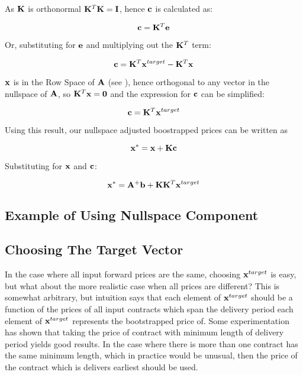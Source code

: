 \documentclass{article}
\begin{document}
As $\mathbf{K}$ is orthonormal $\mathbf{K}^T \mathbf{K} = \mathbf{I}$, hence $\mathbf{c}$ is calculated as:

\begin{equation}
    \mathbf{c} = \mathbf{K}^T \mathbf{e}
\end{equation}

Or, substituting for $\mathbf{e}$ and multiplying out the $\mathbf{K}^T$ term:

\begin{equation}
    \mathbf{c} = \mathbf{K}^T \mathbf{x}^{target} - \mathbf{K}^T \mathbf{x}
\end{equation}

$\mathbf{x}$ is in the Row Space of $\mathbf{A}$ (see \cite{Strang}), hence orthogonal to 
any vector in the nullspace of $\mathbf{A}$, so $\mathbf{K}^T \mathbf{x} = \mathbf{0}$ and the expression 
for $\mathbf{c}$ can be simplified:

\begin{equation}
    \mathbf{c} = \mathbf{K}^T \mathbf{x}^{target}
\end{equation}



Using this result, our nullspace adjusted boostrapped prices can be written as

\begin{equation}
    \mathbf{x}^* = \mathbf{x} + \mathbf{K}\mathbf{c}
\end{equation}

Substituting for $\mathbf{x}$ and $\mathbf{c}$:

\begin{equation}
    \mathbf{x}^* = \mathbf{A}^+ \mathbf{b} + \mathbf{K} \mathbf{K}^T \mathbf{x}^{target}
\end{equation}


\subsection{Example of Using Nullspace Component}


\subsection{Choosing The Target Vector}
In the case where all input forward prices are the same, choosing $\mathbf{x}^{target}$ is
easy, but what about the more realistic case when all prices are different? This is
somewhat arbitrary, but intuition says that each element of $\mathbf{x}^{target}$ should be
a function of the prices of all input contracts which span the delivery period 
each element of $\mathbf{x}^{target}$ represents the bootstrapped price of. Some experimentation
has shown that taking the price of contract with minimum length of delivery period yields
good results. In the case where there is more than one contract has the same minimum length,
which in practice would be unusual, then the price of the contract which is delivers earliest 
should be used.
\end{document}
